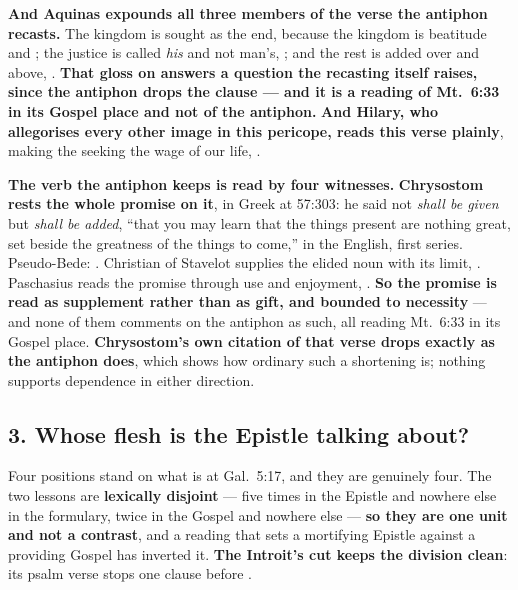 \textbf{And Aquinas expounds all three members of the verse the antiphon
recasts.} The kingdom is sought as the end, because the kingdom is beatitude and
; the justice is called \emph{his} and not man's, ; and the rest is added
over and above, . \textbf{That gloss on
 answers a question the recasting itself raises, since the
antiphon drops the clause --- and it is a reading of Mt.\ 6:33 in its Gospel
place and not of the antiphon.} \textbf{And Hilary, who allegorises every other
image in this pericope, reads this verse plainly}, making the seeking the wage
of our life, .

\textbf{The verb the antiphon keeps is read by four witnesses.}
\textbf{Chrysostom rests the whole promise on it}, in Greek at
 57:303: he said not \emph{shall be given} but
\emph{shall be added}, ``that you may learn that the things present are nothing
great, set beside the greatness of the things to come,'' in the  English, first series.
Pseudo-Bede: . Christian of Stavelot supplies
the elided noun with its limit, . Paschasius reads the promise
through use and enjoyment, . \textbf{So the promise is read as supplement rather than as gift, and
bounded to necessity} --- and none of them comments on the antiphon as such, all
reading Mt.\ 6:33 in its Gospel place. \textbf{Chrysostom's own citation of that
verse drops  exactly as the antiphon does}, which shows
how ordinary such a shortening is; nothing supports dependence in either
direction.

\subsection*{3. Whose flesh is the Epistle talking about?}

Four positions stand on what  is at Gal.\ 5:17, and they are
genuinely four. The two lessons
are \textbf{lexically disjoint} ---  five times in the Epistle and
nowhere else in the formulary,  twice in the Gospel and nowhere
else --- \textbf{so they are one unit and not a contrast}, and a reading that
sets a mortifying Epistle against a providing Gospel has inverted it.
\textbf{The Introit's cut keeps the division clean}: its psalm verse stops one
clause before .

